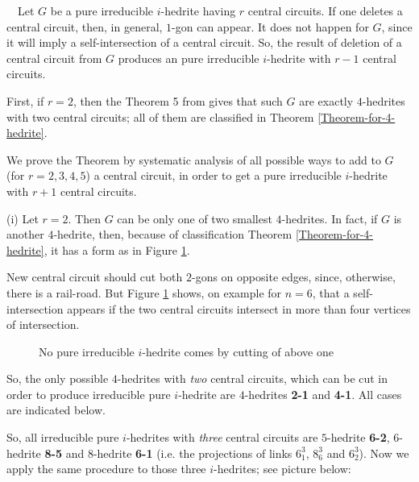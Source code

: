 \documentclass[12pt]{article}
\newcommand{\proof}{\noindent{\bf Proof.}\ \ }
\begin{document}
\proof Let $G$ be a pure irreducible $i$-hedrite having $r$ central circuits. 
If one deletes a central circuit, then, in general, $1$-gon can appear. It 
does not happen for $G$, since it will imply a self-intersection of a central 
circuit. So, the result of deletion of a central circuit from $G$ 
produces an pure irreducible $i$-hedrite with $r-1$ central circuits.

First, if $r=2$, then the Theorem 5 from \cite{DSt} gives that such $G$ are 
exactly $4$-hedrites with two central circuits; all of them are classified 
in Theorem \ref{Theorem-for-4-hedrite}.

We prove the Theorem by systematic analysis of all possible ways to add 
to $G$ (for $r=2,3,4,5$) a central circuit, in order to get a pure 
irreducible $i$-hedrite with $r+1$ central circuits. 


(i) Let $r=2$. Then $G$ can be only one of two smallest $4$-hedrites. In 
fact, if $G$ is another $4$-hedrite, then, because of classification Theorem 
\ref{Theorem-for-4-hedrite}, it has a form as in Figure \ref{Cutting4hedrite}.

New central circuit should cut both $2$-gons on opposite edges, since, otherwise, there is a rail-road. But Figure \ref{Cutting4hedrite} shows, on example for $n=6$, that a self-intersection appears if the two central circuits intersect in more than four vertices of intersection.


\begin{figure}
\centering
\epsfxsize=55mm
\caption{No pure irreducible $i$-hedrite comes by cutting of above one}
\label{Cutting4hedrite}
\end{figure}



So, the only possible $4$-hedrites with {\em two} central circuits,
which can be cut in order to produce irreducible pure $i$-hedrite
are $4$-hedrites {\bf 2-1} and {\bf 4-1}. All cases are indicated below. 

\begin{center}
\epsfxsize=120mm
\end{center}

So, all irreducible pure $i$-hedrites with {\em three} central circuits are $5$-hedrite {\bf 6-2}, $6$-hedrite {\bf 8-5} and $8$-hedrite {\bf 6-1} (i.e. the projections of links $6^3_1$, $8^3_6$ and $6^3_2$).
Now we apply the same procedure to those three $i$-hedrites; see picture below:
\end{document}
